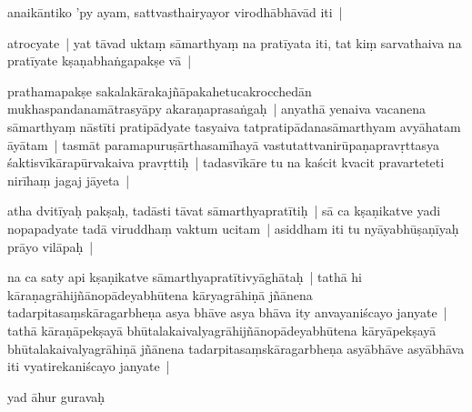 \documentclass[article,12pt,a4paper]{memoir}%
\newcounter{parCount}
\begin{document}
	  
	  \pstart \leavevmode%
	\label{thakur75-72.1}anaikāntiko 'py ayam, sattvasthairyayor virodhābhāvād iti |
	{}
	\pend%
      

	  
	  \pstart \leavevmode%
	\label{thakur75-72.2}atrocyate | yat tāvad uktaṃ sāmarthyaṃ na pratīyata iti, tat kiṃ sarvathaiva na pratīyate kṣaṇabhaṅgapakṣe vā |
	{}
	\pend%
      

	  
	  \pstart \leavevmode%
	\label{thakur75-72.4}prathamapakṣe sakalakārakajñāpakahetucakrocchedān mukhaspandanamātrasyāpy akaraṇaprasaṅgaḥ | anyathā yenaiva vacanena sāmarthyaṃ nāstīti pratipādyate tasyaiva tatpratipādanasāmarthyam avyāhatam āyātam | tasmāt paramapuruṣārthasamīhayā vastutattvanirūpaṇapravṛttasya śaktisvīkārapūrvakaiva pravṛttiḥ | tadasvīkāre tu na kaścit kvacit pravarteteti nirīhaṃ jagaj jāyeta |
	{}
	\pend%
      

	  
	  \pstart \leavevmode%
	\label{thakur75-72.9}atha dvitīyaḥ pakṣaḥ, tadāsti tāvat sāmarthyapratītiḥ | sā ca kṣaṇikatve yadi nopapadyate tadā viruddhaṃ vaktum ucitam | asiddham iti tu nyāyabhūṣaṇīyaḥ prāyo vilāpaḥ |
	{}
	\pend%
      

	  
	  \pstart \leavevmode%
	\label{thakur75-72.11}na ca saty api kṣaṇikatve sāmarthyapratītivyāghātaḥ | tathā hi kāraṇagrāhijñānopādeyabhūtena kāryagrāhiṇā jñānena tadarpitasaṃskāragarbheṇa asya bhāve asya bhāva ity anvayaniścayo janyate | tathā kāraṇāpekṣayā bhūtalakaivalyagrāhijñānopādeyabhūtena kāryāpekṣayā bhūtalakaivalyagrāhiṇā jñānena tadarpitasaṃskāragarbheṇa asyābhāve asyābhāva iti vyatirekaniścayo janyate |
	{}
	\pend%
      

	  
	  \pstart \leavevmode%
	\label{thakur75-72.15}yad āhur guravaḥ
	{}
	\pend%
      
\end{document}
